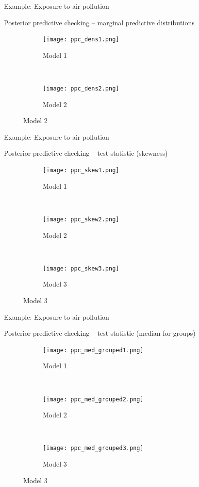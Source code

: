 \documentclass[t]{beamer}
\begin{document}
\begin{frame}{Example: Exposure to air pollution}

  Posterior predictive checking -- marginal predictive distributions
\begin{figure}
\centering
\begin{subfigure}{0.48\textwidth}
\texttt{[image: ppc\_dens1.png]}
\caption{Model 1}
\end{subfigure}
~
\begin{subfigure}{0.48\textwidth}
\texttt{[image: ppc\_dens2.png]}
\caption{Model 2}
\end{subfigure}
\end{figure}

\end{frame}

\begin{frame}{Example: Exposure to air pollution}


  Posterior predictive checking -- test statistic (skewness)
\begin{figure}
\centering
\begin{subfigure}{0.31\textwidth}
\texttt{[image: ppc\_skew1.png]}
\caption{Model 1}
\end{subfigure}
~
\begin{subfigure}{0.31\textwidth}
\texttt{[image: ppc\_skew2.png]}
\caption{Model 2}
\end{subfigure}
~
\begin{subfigure}{0.31\textwidth}
\texttt{[image: ppc\_skew3.png]}
\caption{Model 3}
\end{subfigure}

\end{figure}

\end{frame}

\begin{frame}{Example: Exposure to air pollution}


  Posterior predictive checking -- test statistic (median for groups)

  \begin{figure}
\centering
\begin{subfigure}{.31\textwidth}
\texttt{[image: ppc\_med\_grouped1.png]}
\caption{Model 1}
\end{subfigure}
~
\begin{subfigure}{.31\textwidth}
\texttt{[image: ppc\_med\_grouped2.png]}
\caption{Model 2}
\end{subfigure}
~
\begin{subfigure}{.31\textwidth}
\texttt{[image: ppc\_med\_grouped3.png]}
\caption{Model 3}
\end{subfigure}

\end{figure}

\end{frame}
\end{document}
